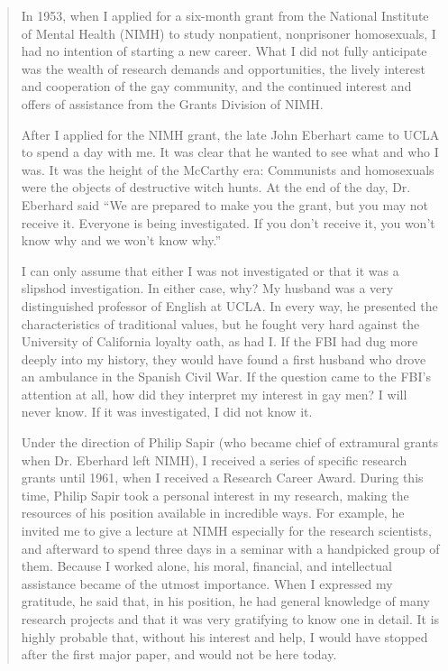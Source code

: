 \begin{quote}

In 1953, when I applied for a six-month grant from the National Institute of Mental Health (NIMH) to study nonpatient, nonprisoner homosexuals, I had no intention of starting a new career. What I did not fully anticipate was the wealth of research demands and opportunities, the lively interest and cooperation of the gay community, and the continued interest and offers of assistance from the Grants Division of NIMH.

After I applied for the NIMH grant, the late John Eberhart came to UCLA to spend a day with me. It was clear that he wanted to see what and who I was. It was the height of the McCarthy era: Communists and homosexuals were the objects of destructive witch hunts. At the end of the day, Dr. Eberhard said ``We are prepared to make you the grant, but you may not receive it. Everyone is being investigated. If you don't receive it, you won't know why and we won't know why.''

I can only assume that either I was not investigated or that it was a slipshod investigation. In either case, why? My husband was a very distinguished professor of English at UCLA. In every way, he presented the characteristics of traditional values, but he fought very hard against the University of California loyalty oath, as had I. If the FBI had dug more deeply into my history, they would have found a first husband who drove an ambulance in the Spanish Civil War. If the question came to the FBI's attention at all, how did they interpret my interest in gay men? I will never know. If it was investigated, I did not know it.

Under the direction of Philip Sapir (who became chief of extramural grants when Dr. Eberhard left NIMH), I received a series of specific research grants until 1961, when I received a Research Career Award. During this time, Philip Sapir took a personal interest in my research, making the resources of his position available in incredible ways. For example, he invited me to give a lecture at NIMH especially for the research scientists, and afterward to spend three days in a seminar with a handpicked group of them. Because I worked alone, his moral, financial, and intellectual assistance became of the utmost importance. When I expressed my gratitude, he said that, in his position, he had general knowledge of many research projects and that it was very gratifying to know one in detail. It is highly probable that, without his interest and help, I would have stopped after the first major paper, and would not be here today.


\end{quote}
